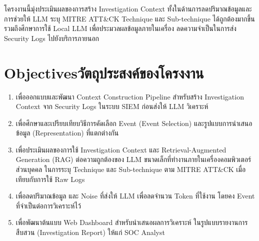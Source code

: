 โครงงานนี้มุ่งประเมินผลของการสร้าง Investigation Context 
ทั้งในด้านการลดปริมาณข้อมูลและการช่วยให้ LLM ระบุ MITRE ATT\&CK Technique
และ Sub-technique ได้ถูกต้องมากขึ้น รวมถึงศึกษาการใช้ Local LLM
เพื่อประมวลผลข้อมูลภายในเครื่อง ลดความจำเป็นในการส่ง Security Logs
ไปยังบริการภายนอก


\section{\ifenglish Objectives\else วัตถุประสงค์ของโครงงาน\fi}
\begin{enumerate}
    \item เพื่อออกแบบและพัฒนา Context Construction Pipeline สำหรับสร้าง
          Investigation Context จาก Security Logs ในระบบ SIEM
          ก่อนส่งให้ LLM วิเคราะห์

    \item เพื่อศึกษาและเปรียบเทียบวิธีการคัดเลือก Event (Event Selection)
          และรูปแบบการนำเสนอข้อมูล (Representation) ที่แตกต่างกัน

    \item เพื่อประเมินผลของการใช้ Investigation Context และ
          Retrieval-Augmented Generation (RAG) ต่อความถูกต้องของ LLM
          ขนาดเล็กที่ทำงานภายในเครื่องคอมพิวเตอร์ส่วนบุคคล ในการระบุ Technique และ Sub-technique
          ตาม MITRE ATT\&CK เมื่อเทียบกับการใช้ Raw Logs

    \item เพื่อลดปริมาณข้อมูล และ Noise ที่ส่งให้ LLM เพื่อลดจำนวน Token ที่ใช้งาน โดยคง Event ที่จำเป็นต่อการวิเคราะห์ไว้

    \item เพื่อพัฒนาต้นแบบ Web Dashboard สำหรับนำเสนอผลการวิเคราะห์
          ในรูปแบบรายงานการสืบสวน (Investigation Report)
          ให้แก่ SOC Analyst
\end{enumerate}

